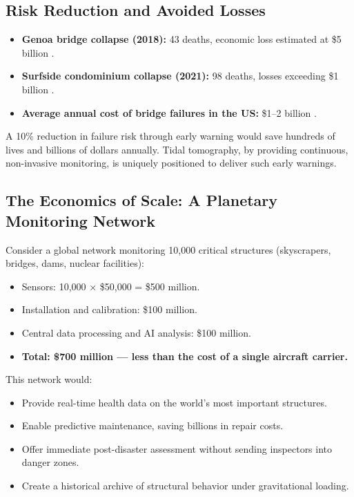 \documentclass[12pt,a4paper]{article}
\theoremstyle{remark}
\begin{document}
	\subsection{Risk Reduction and Avoided Losses}
	
	\begin{itemize}
		\item \textbf{Genoa bridge collapse (2018):} 43 deaths, economic loss estimated at \$5 billion \cite{Genoa2018}.
		\item \textbf{Surfside condominium collapse (2021):} 98 deaths, losses exceeding \$1 billion \cite{Surfside2021}.
		\item \textbf{Average annual cost of bridge failures in the US:} \$1–2 billion \cite{ASCE2021}.
	\end{itemize}
	
	A 10\% reduction in failure risk through early warning would save hundreds of lives and billions of dollars annually. Tidal tomography, by providing continuous, non-invasive monitoring, is uniquely positioned to deliver such early warnings.
	
	\subsection{The Economics of Scale: A Planetary Monitoring Network}
	
	Consider a global network monitoring 10,000 critical structures (skyscrapers, bridges, dams, nuclear facilities):
	
	\begin{itemize}
		\item Sensors: 10,000 × \$50,000 = \$500 million.
		\item Installation and calibration: \$100 million.
		\item Central data processing and AI analysis: \$100 million.
		\item \textbf{Total: \$700 million — less than the cost of a single aircraft carrier.}
	\end{itemize}
	
	This network would:
	\begin{itemize}
		\item Provide real-time health data on the world's most important structures.
		\item Enable predictive maintenance, saving billions in repair costs.
		\item Offer immediate post-disaster assessment without sending inspectors into danger zones.
		\item Create a historical archive of structural behavior under gravitational loading.
	\end{itemize}
	
\end{document}

